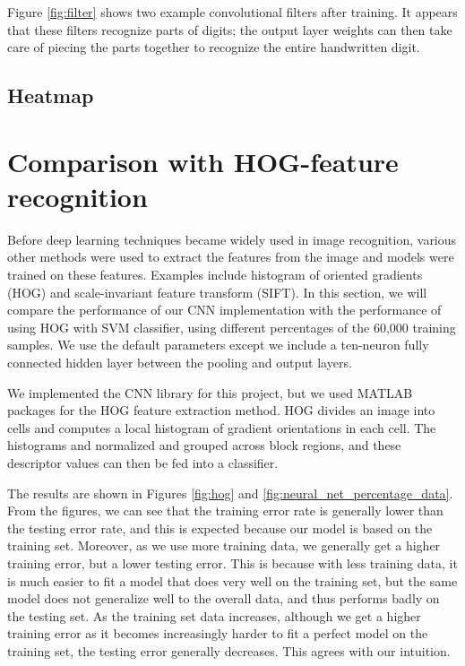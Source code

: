\documentclass[10pt,twocolumn]{article}
\begin{document}
Figure \ref{fig:filter} shows two example convolutional filters after training. It appears that these filters recognize parts of digits; the output layer weights can then take care of piecing the parts together to recognize the entire handwritten digit.

\subsection{Heatmap}

\section{Comparison with HOG-feature recognition} \label{sec:evalfeature}

Before deep learning techniques became widely used in image recognition, various other methods were used to extract the features from the image and models were trained on these features. Examples include histogram of oriented gradients (HOG) and scale-invariant feature transform (SIFT). In this section, we will compare the performance of our CNN implementation with the performance of using HOG with SVM classifier, using different percentages of the 60,000 training samples. We use the default parameters except we include a ten-neuron fully connected hidden layer between the pooling and output layers.

We implemented the CNN library for this project, but we used MATLAB packages for the HOG feature extraction method. HOG divides an image into cells and computes a local histogram of gradient orientations in each cell. The histograms and normalized and grouped across block regions, and these descriptor values can then be fed into a classifier.

The results are shown in Figures \ref{fig:hog} and \ref{fig:neural_net_percentage_data}. From the figures, we can see that the training error rate is generally lower than the testing error rate, and this is expected because our model is based on the training set. Moreover, as we use more training data, we generally get a higher training error, but a lower testing error. This is because with less training data, it is much easier to fit a model that does very well on the training set, but the same model does not generalize well to the overall data, and thus performs badly on the testing set. As the training set data increases, although we get a higher training error as it becomes increasingly harder to fit a perfect model on the training set, the testing error generally decreases. This agrees with our intuition.
\end{document}
